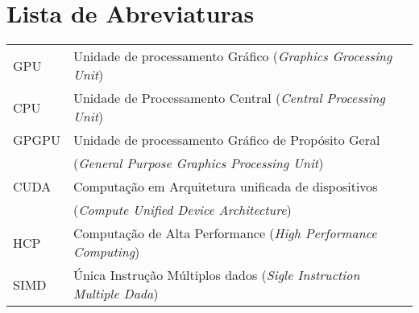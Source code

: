 \documentclass[12pt,twoside,a4paper]{book}
\renewcommand{\chaptermark}[1]{\markboth{\MakeUppercase{#1}}{}}
\begin{document}
\chapter{Lista de Abreviaturas}
\begin{tabular}{ll}
  GPU   & Unidade de processamento Gráfico (\emph{Graphics Grocessing Unit})\\

  CPU   & Unidade de Processamento Central (\emph{Central Processing Unit})\\

  GPGPU & Unidade de processamento Gráfico de Propósito Geral\\
        & (\emph{General Purpose Graphics Processing Unit})\\

  CUDA  & Computação em Arquitetura unificada de dispositivos\\
        & (\emph{Compute Unified Device Architecture})\\

  HCP   & Computação de Alta Performance (\emph{High Performance Computing})\\

  SIMD  & Única Instrução Múltiplos dados (\emph{Sigle Instruction Multiple Dada})\\
\end{tabular}

\mainmatter

\fancyhead[RE,LO]{\thesection}

\onehalfspacing            %








\renewcommand{\chaptermark}[1]{\markboth{\MakeUppercase{\appendixname\ \thechapter}} {\MakeUppercase{#1}} }
\fancyhead[RE,LO]{}
\appendix



\backmatter \singlespacing   %



\end{document}
